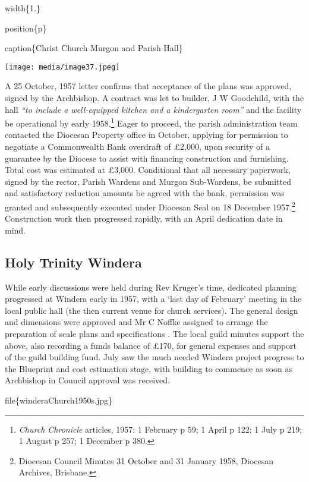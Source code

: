 width\{1.\}

position\{p\}

caption\{Christ Church Murgon and Parish Hall\}

\texttt{[image: media/image37.jpeg]}

A 25 October, 1957 letter confirms that acceptance of the plans was approved, signed by the Archbishop. A contract was let to builder, J W Goodchild, with the hall \emph{``to include a well-equipped kitchen and a kindergarten room''} and the facility be operational by early 1958.\footnote{\emph{Church Chronicle} articles, 1957: 1 February p 59; 1 April p 122; 1 July p 219; 1 August p 257; 1 December p 380.} Eager to proceed, the parish administration team contacted the Diocesan Property office in October, applying for permission to negotiate a Commonwealth Bank overdraft of £2,000, upon security of a guarantee by the Diocese to assist with financing construction and furnishing. Total cost was estimated at £3,000. Conditional that all necessary paperwork, signed by the rector, Parish Wardens and Murgon Sub-Wardens, be submitted and satisfactory reduction amounts be agreed with the bank, permission was granted and subsequently executed under Diocesan Seal on 18 December 1957.\footnote{Diocesan Council Minutes 31 October and 31 January 1958, Diocesan Archives, Brisbane.} Construction work then progressed rapidly, with an April dedication date in mind.

\hypertarget{holy-trinity-windera}{%
\subsection{Holy Trinity Windera}\label{holy-trinity-windera}}

While early discussions were held during Rev Kruger's time, dedicated planning progressed at Windera early in 1957, with a `last day of February' meeting in the local public hall (the then current venue for church services). The general design and dimensions were approved and Mr C Noffke assigned to arrange the preparation of scale plans and specifications . The local guild minutes support the above, also recording a funds balance of £170, for general expenses and support of the guild building fund. July saw the much needed Windera project progress to the Blueprint and cost estimation stage, with building to commence as soon as Archbishop in Council approval was received.

file\{winderaChurch1950s.jpg\}

